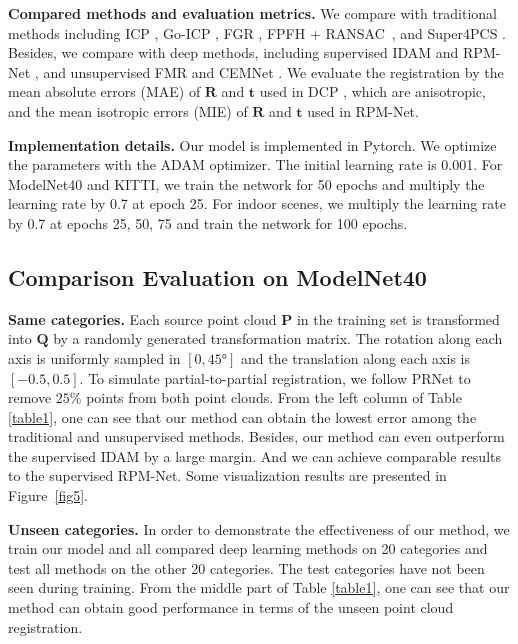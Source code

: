 \documentclass[letterpaper]{article} %
\begin{document}
	\noindent \textbf{Compared methods and evaluation metrics.} We compare with traditional methods including ICP \cite{besl1992method}, Go-ICP \cite{yang2013go}, FGR \cite{zhou2016fast}, FPFH + RANSAC~\cite{fischler1981random}, and Super4PCS \cite{mellado2014super}. Besides, we compare with deep methods, including supervised IDAM \cite{li2020iterative} and RPM-Net \cite{yew2020rpm}, and unsupervised FMR \cite{huang2020feature} and CEMNet \cite{jiang2021CEMNet}. %
	We evaluate the registration by the mean absolute errors (MAE) of $\mathbf{R}$ and $\mathbf{t}$ used in DCP \cite{wang2019deep}, which are anisotropic, and the mean isotropic errors (MIE) of $\mathbf{R}$ and $\mathbf{t}$ used in RPM-Net.

	\noindent \textbf{Implementation details.} Our model is implemented in Pytorch. We optimize the parameters with the ADAM optimizer. The initial learning rate is 0.001. For ModelNet40 and KITTI, we train the network for 50 epochs and multiply the learning rate by 0.7 at epoch 25. For indoor scenes, we multiply the learning rate by 0.7 at epochs 25, 50, 75 and train the network for 100 epochs.

	\subsection{Comparison Evaluation on ModelNet40}
	\noindent \textbf{Same categories.}
	Each source point cloud $\mathbf{P}$ in the training set is transformed into $\mathbf{Q}$ by a randomly generated transformation matrix. The rotation along each axis is uniformly sampled in $[0,\ang{45}]$ and the translation along each axis is $[-0.5,0.5]$. To simulate partial-to-partial registration, we follow PRNet \cite{wang2019prnet} to remove $25\%$ points from both point clouds.
	From the left column of Table \ref{table1}, one can see that our method can obtain the lowest error among the traditional and unsupervised methods. Besides, our method can even outperform the supervised IDAM by a large margin. And we can achieve comparable results to the supervised RPM-Net.
	Some visualization results are presented in Figure~\ref{fig5}.%

	\noindent \textbf{Unseen categories.} In order to demonstrate the effectiveness of our method, we train our model and all compared deep learning methods on 20 categories and test all methods on the other 20 categories. The test categories have not been seen during training. From the middle part of Table \ref{table1}, one can see that our method can obtain good performance in terms of the unseen point cloud registration.
\end{document}

